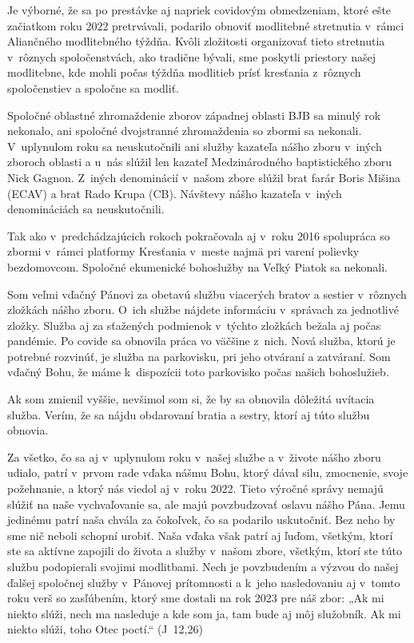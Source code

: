 
Je výborné, že sa po prestávke aj napriek covidovým obmedzeniam, ktoré ešte začiatkom roku 2022 pretrvávali, podarilo obnoviť modlitebné stretnutia v~rámci Aliančného modlitebného týždňa. Kvôli zložitosti organizovať tieto stretnutia v~rôznych spoločenstvách, ako tradične bývali, sme poskytli priestory našej modlitebne, kde mohli počas týždňa modlitieb prísť kresťania z~rôznych spoločenstiev a spoločne sa modliť.

Spoločné oblastné zhromaždenie zborov západnej oblasti BJB sa minulý rok nekonalo, ani spoločné dvojstranné zhromaždenia so zbormi sa nekonali. V~uplynulom roku sa neuskutočnili ani služby kazateľa nášho zboru v~iných zboroch oblasti a u~nás slúžil len kazateľ Medzinárodného baptistického zboru Nick Gagnon. Z~iných denominácií v~našom zbore slúžil brat farár Boris Mišina (ECAV) a brat Rado Krupa (CB). Návštevy nášho kazateľa v~iných denomináciách sa neuskutočnili.

Tak ako v~predchádzajúcich rokoch pokračovala aj v~roku 2016 spolupráca so zbormi v~rámci platformy Kresťania v~meste najmä pri varení polievky bezdomovcom. Spoločné ekumenické bohoslužby na Veľký Piatok sa nekonali.


Som veľmi vďačný Pánovi za obetavú službu viacerých bratov a sestier v~rôznych zložkách nášho zboru. O~ich službe nájdete informáciu v~správach za jednotlivé zložky. Služba aj za sťažených podmienok v~týchto zložkách bežala aj počas pandémie. Po covide sa obnovila práca vo väčšine z~nich. Nová služba, ktorú je potrebné rozvinúť, je služba na parkovisku, pri jeho otváraní a zatváraní. Som vďačný Bohu, že máme k~dispozícii toto parkovisko počas našich bohoslužieb.

Ak som zmienil vyššie, nevšimol som si, že by sa obnovila dôležitá uvítacia služba. Verím, že sa nájdu obdarovaní bratia a sestry, ktorí aj túto službu obnovia.


Za všetko, čo sa aj v~uplynulom roku v~našej službe a v~živote nášho zboru udialo, patrí v~prvom rade vďaka nášmu Bohu, ktorý dával silu, zmocnenie, svoje požehnanie, a ktorý nás viedol aj v~roku 2022. Tieto výročné správy nemajú slúžiť na naše vychvaľovanie sa, ale majú povzbudzovať oslavu nášho Pána. Jemu jedinému patrí naša chvála za čokoľvek, čo sa podarilo uskutočniť. Bez neho by sme nič neboli schopní urobiť. Naša vďaka však patrí aj ľuďom, všetkým, ktorí ste sa aktívne zapojili do života a služby v~našom zbore, všetkým, ktorí ste túto službu podopierali svojimi modlitbami. Nech je povzbudením a výzvou do našej ďalšej spoločnej služby v~Pánovej prítomnosti a k~jeho nasledovaniu aj v~tomto roku verš so zasľúbením, ktorý sme dostali na rok 2023 pre náš zbor: „Ak mi niekto slúži, nech ma nasleduje a kde som ja, tam bude aj môj služobník. Ak mi niekto slúži, toho Otec poctí.“ (J~12,26)

